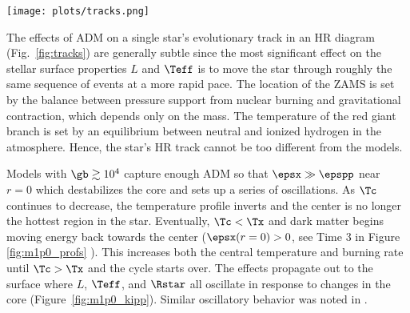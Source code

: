 \begin{figure*}
  \centering
  \texttt{[image: plots/tracks.png]}
  \caption{
  Stellar evolution tracks from ZAMS to core helium depletion ($Y_c<10^{-12}$). x's mark the location where stars leave the MS, defined here as core hydrogen depletion below $X_c<10^{-3}$. For reference, the location of the ZAMS and core hydrogen depletion for \nodm models are plotted as dotted and solid black lines respectively.
  }
  \label{fig:tracks}

\end{figure*}


The effects of ADM on a single star's evolutionary track in an HR diagram (Fig.~\ref{fig:tracks}) are generally subtle since the most significant effect on the stellar surface properties $L$ and $\Teff$ is to move the star through roughly the same sequence of events at a more rapid pace. The location of the ZAMS is set by the balance between pressure support from nuclear burning and gravitational contraction, which depends only on the mass. The temperature of the red giant branch is set by an equilibrium between neutral and ionized hydrogen in the atmosphere. Hence, the star's HR track cannot be too different from the \nodm models.


Models with $\gb \gtrsim 10^4$ capture enough ADM so that $\epsx \gg \epspp$ near $r=0$ which destabilizes the core and sets up a series of oscillations.
As $\Tc$ continues to decrease, the temperature profile inverts and the center is no longer the hottest region in the star. Eventually, $\Tc < \Tx$ and dark matter begins moving energy back towards the center ($\epsx(r=0) > 0$, see Time 3 in Figure \ref{fig:m1p0_profs} ). This increases both the central temperature and burning rate until $\Tc > \Tx$ and the cycle starts over. The effects propagate out to the surface where
$L$, $\Teff$, and $\Rstar$ all oscillate in response to changes in the core (Figure~\ref{fig:m1p0_kipp}). Similar oscillatory behavior was noted in \citet{Iocco2012} .

